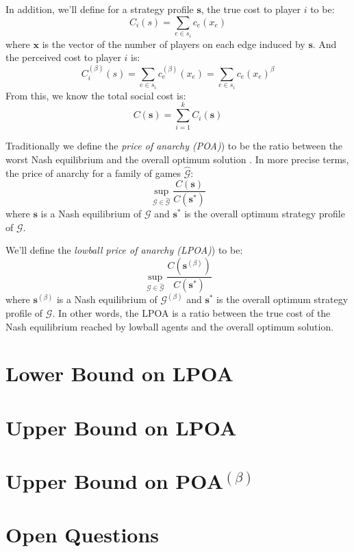 \documentclass[twoside]{article}
\newcommand{\pbet}{^{(\beta)}}
\newcommand{\s}{\mathbf{s}}
\newcommand{\cit}{\textbf{CITE!!}}
\begin{document}
\begin{multicols}{2}
In addition, we'll define for a strategy profile $\mathbf{s}$, the true cost to player $i$ to be: \[C_i(s) = \sum\limits_{e \in s_i}c_e(x_e)\] where $\mathbf{x}$ is the vector of the number of players on each edge induced by $\mathbf{s}$.  And the perceived cost to player $i$ is: \[C\pbet_i(s) = \sum\limits_{e \in s_i}c_e\pbet(x_e) = \sum\limits_{e \in s_i}c_e(x_e)^\beta\]  From this, we know the total social cost is: \[C(\mathbf{s}) = \sum_{i=1}^{k}C_i(\mathbf{s})\]
        
Traditionally we define the \textit{price of anarchy (POA)}) to be the ratio
between the worst Nash equilibrium and the overall optimum solution
\cite{Koutsoupias2009}.  In more precise terms, the price of anarchy for a family of games $\hat{\mathcal{G}}$: \[\sup_{\mathcal{G} \in \hat{\mathcal{G}}} \frac{C(\s)}{C(\s^*)}\] where $\s$ is a Nash equilibrium of $\mathcal{G}$ and $\s^*$ is the overall optimum strategy profile of $\mathcal{G}$.

We'll define the \textit{lowball price of anarchy (LPOA)}) to be: \[\sup_{\mathcal{G} \in \hat{\mathcal{G}}} \frac{C(\s\pbet)}{C(\s^*)}\] where $\s\pbet$ is a Nash equilibrium of $\mathcal{G}\pbet$ and $\s^*$ is the overall optimum strategy profile of $\mathcal{G}$.  In other words, the LPOA is a ratio between the true cost of the Nash equilibrium reached by lowball agents and the overall optimum solution.

\section{Lower Bound on LPOA}

\section{Upper Bound on LPOA}

\section{Upper Bound on POA$\pbet$}

\section{Open Questions}

\printbibliography






\end{multicols}
\end{document}
